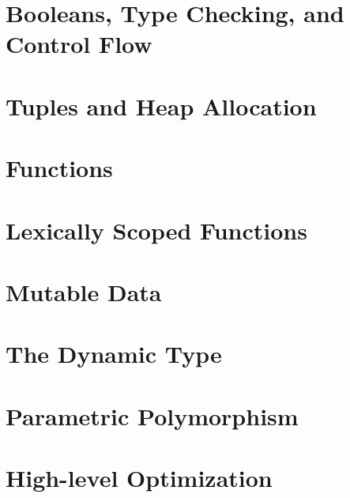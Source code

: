 \documentclass[12pt]{book}
\begin{document}
\chapter{Booleans, Type Checking, and Control Flow}
\label{ch:bool-types}


\chapter{Tuples and Heap Allocation}
\label{ch:tuples}

\chapter{Functions}
\label{ch:functions}


\chapter{Lexically Scoped Functions}
\label{ch:lambdas}


\chapter{Mutable Data}
\label{ch:mutable-data}

\chapter{The Dynamic Type}
\label{ch:type-dynamic}


\chapter{Parametric Polymorphism}
\label{ch:parametric-polymorphism}

\chapter{High-level Optimization}
\label{ch:high-level-optimization}




\end{document}
